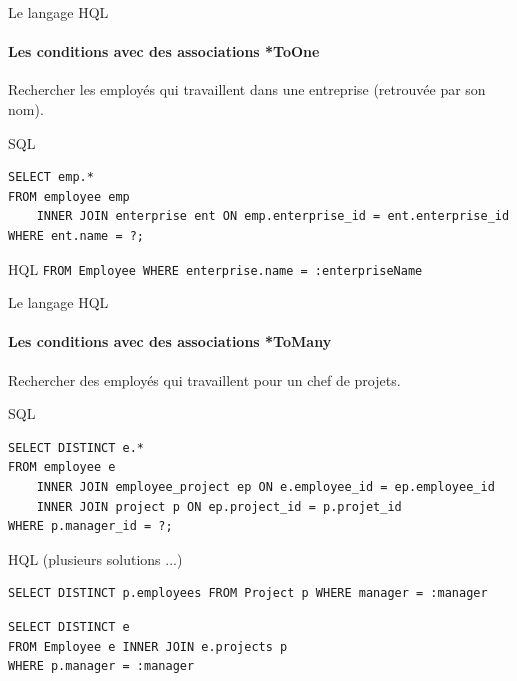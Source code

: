 \documentclass[compress]{beamer}%
\begin{document}
\begin{frame}[fragile]{Le langage HQL}
	\framesubtitle{Les conditions avec des associations *ToOne}
	
	\begin{block}{}
		\center
		Rechercher les employés qui travaillent dans une entreprise (retrouvée par son nom).
	\end{block}
	
	\begin{exampleblock}{SQL}
	\begin{lstlisting}
SELECT emp.*
FROM employee emp
    INNER JOIN enterprise ent ON emp.enterprise_id = ent.enterprise_id
WHERE ent.name = ?;
	\end{lstlisting}
	\end{exampleblock}

	\pause
	\begin{exampleblock}{HQL}
		\texttt{FROM Employee WHERE enterprise.name = :enterpriseName}
	\end{exampleblock}

\end{frame}

\begin{frame}[fragile]{Le langage HQL}
	\framesubtitle{Les conditions avec des associations *ToMany}
	
	\begin{block}{}
		\center
		Rechercher des employés qui travaillent pour un chef de projets.
	\end{block}
	
	\begin{exampleblock}{SQL}
	\begin{lstlisting}
SELECT DISTINCT e.*
FROM employee e
    INNER JOIN employee_project ep ON e.employee_id = ep.employee_id
    INNER JOIN project p ON ep.project_id = p.projet_id
WHERE p.manager_id = ?;
	\end{lstlisting}
	\end{exampleblock}
	
	\pause
	\begin{exampleblock}{HQL (plusieurs solutions ...)}
	\begin{lstlisting}
SELECT DISTINCT p.employees FROM Project p WHERE manager = :manager
	\end{lstlisting}
	\pause
	\begin{lstlisting}
SELECT DISTINCT e
FROM Employee e INNER JOIN e.projects p
WHERE p.manager = :manager
	\end{lstlisting}
	\end{exampleblock}

\end{frame}
\end{document}
